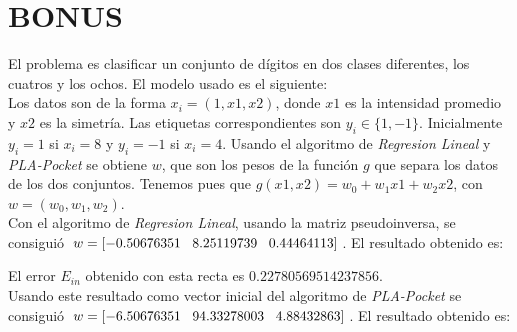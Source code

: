 \documentclass{article}
\begin{document}
\section{BONUS}

El problema es clasificar un conjunto de dígitos en dos clases diferentes, los cuatros y los ochos.
El modelo usado es el siguiente:\\
Los datos son de la forma $x_i = (1, x1, x2)$, donde $x1$ es la intensidad promedio y $x2$ es la simetría. Las etiquetas correspondientes son $y_i \in \{1, -1\}$. Inicialmente $y_i = 1$ si $x_i = 8$ y $y_i = -1$ si $x_i = 4$.
Usando el algoritmo de \textit{Regresion Lineal} y \textit{PLA-Pocket} se obtiene $w$, que son los pesos de la función $g$ que separa los datos de los dos conjuntos. Tenemos pues que $g(x1,x2) = w_0 + w_1x1 + w_2x2$, con $w = (w_0, w_1, w_2)$.\\

Con el algoritmo de \textit{Regresion Lineal}, usando la matriz pseudoinversa, se consiguió $w = [-0.50676351 \hspace{3mm} 8.25119739  \hspace{3mm} 0.44464113]$. El resultado obtenido es:

\begin{figure}[H]
  \centering
\end{figure}

El error $E_{in}$ obtenido con esta recta es $0.22780569514237856$.\\

Usando este resultado como vector inicial del algoritmo de \textit{PLA-Pocket} se consiguió $w = [-6.50676351 \hspace{3mm} 94.33278003  \hspace{3mm} 4.88432863]$. El resultado obtenido es:
\end{document}
